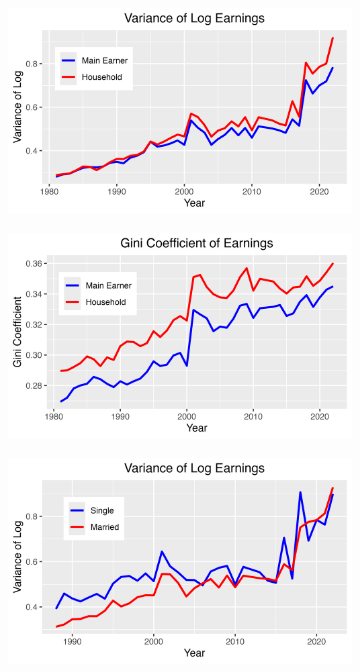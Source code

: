 \documentclass{article}
\begin{document}
\begin{figure}
    \centering
    \begin{subfigure}[t]{0.475\textwidth}
        \centering
        \includegraphics[width=\textwidth]{Fig_3/Fig_3a_Var_indHH.png}
        \label{fig:Indi_to_HH_Var}
    \end{subfigure}
    \begin{subfigure}[t]{0.475\textwidth}
        \centering
        \includegraphics[width=\textwidth]{Fig_3/Fig_3b_Gini_indHH.png}
        \label{fig:Indi_to_HH_Gini}
    \end{subfigure}
    \begin{subfigure}[t]{0.475\textwidth}
        \centering
        \includegraphics[width=\textwidth]{Fig_3/Fig_3c_Var_single.png}

\end{subfigure}
\end{figure}
\end{document}
